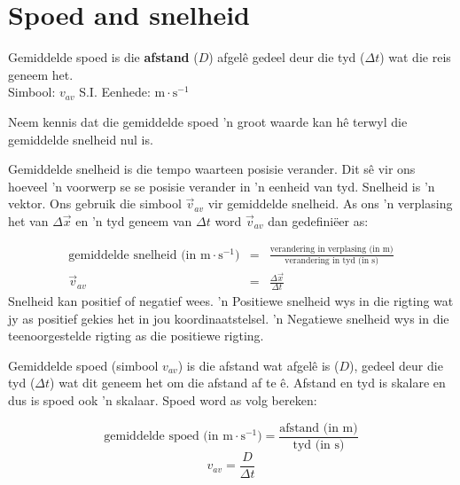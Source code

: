 


\section{Spoed and snelheid} 
    \nopagebreak

{Gemiddelde spoed is die \textbf{afstand} ($D$) afgel\^e gedeel deur die tyd ($\Delta t$) wat die reis geneem het.\\
Simbool: $v_{av}$\hspace{2cm} S.I. Eenhede: $\text{m}\cdot \text{s}^{-1}$} 



Neem kennis dat die gemiddelde spoed 'n groot waarde kan h\^e terwyl die gemiddelde snelheid nul is.

Gemiddelde snelheid is die tempo waarteen posisie verander. Dit s\^e vir ons hoeveel 'n voorwerp se se posisie verander in 'n eenheid van tyd. Snelheid is 'n vektor. Ons gebruik die simbool $\vec{v}_{av}$ vir gemiddelde snelheid. As ons 'n verplasing het van $\Delta \vec{x}$ en 'n tyd geneem van $\Delta t$ word $\vec{v}_{av}$ dan gedefini\"eer as:\par 
\begin{eqnarray*}
\text{gemiddelde snelheid (in m} \cdot \text{s}^{-1}) &=& \frac{\text{verandering in verplasing (in m)}}{\text{verandering in tyd (in s)}}\\
\vec{v}_{av} &=& \frac{\Delta \vec{x}}{\Delta t}
\end{eqnarray*}\label{eq:pr:velocity}
Snelheid kan positief of negatief wees. 'n Positiewe snelheid wys in die rigting wat jy as positief gekies het in jou koordinaatstelsel. 'n Negatiewe snelheid wys in die teenoorgestelde rigting as die positiewe rigting.

Gemiddelde spoed (simbool $v_{av}$) is die afstand wat afgel\^e is ($D$), gedeel deur die tyd ($\Delta t$) wat dit geneem het om die afstand af te \^e. Afstand en tyd is skalare en dus is spoed ook 'n skalaar. Spoed word as volg bereken:\par 
        
\begin{equation*}
\text{gemiddelde spoed (in m} \cdot {\text{s}}^{-1}\text{)}  =  \frac{\text{afstand (in m)}}{\text{tyd (in s)}} 
\end{equation*}
\label{m38791*id64639}\nopagebreak\noindent{}
\begin{equation*}
v_{av}=\frac{D}{\Delta t}
\end{equation*}
     

